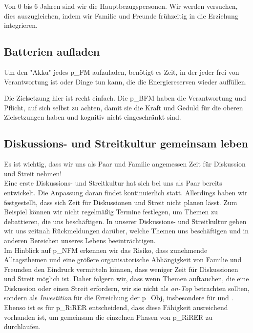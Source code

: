 Von 0 bis 6 Jahren sind wir die Hauptbezugspersonen. Wir werden versuchen, dies auszugleichen, indem wir Familie und Freunde frühzeitig in die Erziehung integrieren.

\subsection{Batterien aufladen}

Um den "Akku" jedes \gls{p_FM} aufzuladen, benötigt es Zeit, in der jeder frei von Verantwortung ist oder Dinge tun kann, die die Energiereserven wieder auffüllen.

Die Zielsetzung hier ist recht einfach. Die \gls{p_BFM} haben die Verantwortung und Pflicht, auf sich selbst zu achten, damit sie die Kraft und Geduld für die oberen Zielsetzungen haben und kognitiv nicht eingeschränkt sind.

\subsection{Diskussions- und Streitkultur gemeinsam leben}\label{subsec_LeitendePrinzipien_Diskussionskultur}

Es ist wichtig, dass wir uns als Paar und Familie angemessen Zeit für Diskussion und Streit nehmen!\\


Eine erste Diskussions- und Streitkultur hat sich bei uns als Paar bereits entwickelt. Die Anpassung daran findet kontinuierlich statt. Allerdings haben wir festgestellt, dass sich Zeit für Diskussionen und Streit nicht planen lässt. Zum Beispiel können wir nicht regelmäßig Termine festlegen, um Themen zu debattieren, die uns beschäftigen. In unserer Diskussions- und Streitkultur geben wir uns zeitnah Rückmeldungen darüber, welche Themen uns beschäftigen und in anderen Bereichen unseres Lebens beeinträchtigen.\\


Im Hinblick auf \gls{p_NFM} erkennen wir das Risiko, dass zunehmende Alltagsthemen und eine größere organisatorische Abhängigkeit von Familie und Freunden den Eindruck vermitteln können, dass weniger Zeit für Diskussionen und Streit möglich ist. Daher folgern wir, dass wenn Themen auftauchen, die eine Diskussion oder einen Streit erfordern, wir sie nicht als \textit{on-Top} betrachten sollten, sondern als \textit{Investition} für die Erreichung der \gls{p_Obj}, insbesondere für \NFMOOne und \NFMOThree. Ebenso ist es für \gls{p_RiRER} entscheidend, dass diese Fähigkeit ausreichend vorhanden ist, um gemeinsam die einzelnen Phasen von \gls{p_RiRER} zu durchlaufen.